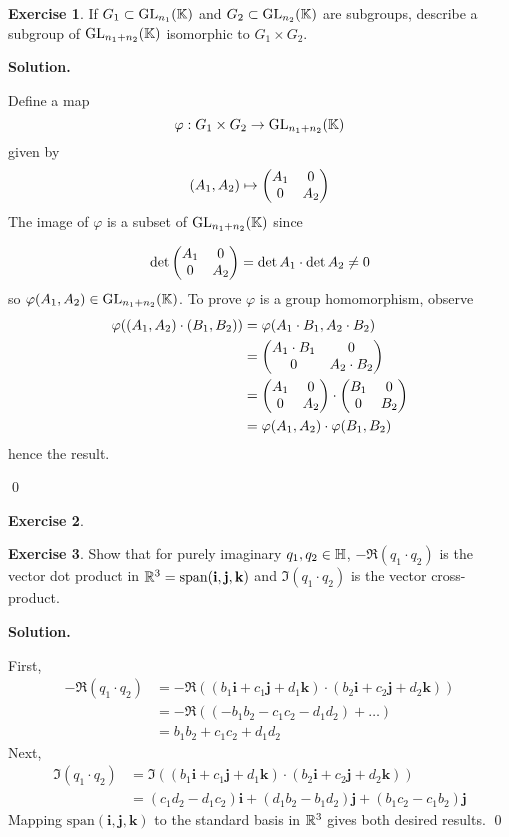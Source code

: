 \documentclass[12pt]{book}
\theoremstyle{definition}
\newtheorem{exercise}{Exercise}[chapter]
\newenvironment{solution}
{%
  \par\noindent\textbf{Solution.}\quad
}
{%
  \qed\par
}
\begin{document}
\begin{exercise}
  If $G_1 \subset \mathrm{GL}_{n_1}(\mathbb{K})$ and $G_2 \subset \mathrm{GL}_{n_2}(\mathbb{K})$ are subgroups, describe a subgroup of $\mathrm{GL}_{n_1 + n_2}(\mathbb{K})$ isomorphic to $G_1 \times G_2$.
\end{exercise}
\begin{solution}
  Define a map 
  \[
  \varphi : G_1 \times G_2 \to \mathrm{GL}_{n_1 + n_2}(\mathbb{K}) \\
  \]
  given by
  \[
  (A_1, A_2) \mapsto \begin{pmatrix} A_1 & 0 \\ 0 & A_2 \end{pmatrix}
  \]
  The image of $\varphi$ is a subset of $\mathrm{GL}_{n_1 + n_2}(\mathbb{K})$ since

  \[
  \det \begin{pmatrix} A_1 & 0 \\ 0 & A_2 \end{pmatrix} = \det A_1 \cdot \det A_2 \neq 0
  \]
  so $\varphi(A_1, A_2) \in \mathrm{GL}_{n_1 + n_2}(\mathbb{K})$.
  To prove $\varphi$ is a group homomorphism, observe
  \[
  \begin{aligned}
    \varphi((A_1, A_2) \cdot (B_1, B_2)) &= \varphi(A_1 \cdot B_1, A_2 \cdot B_2) \\
                                         &= \begin{pmatrix} A_1 \cdot B_1 & 0 \\ 0 & A_2 \cdot B_2 \end{pmatrix} \\
                                         &= \begin{pmatrix} A_1 & 0 \\ 0 & A_2 \end{pmatrix} \cdot \begin{pmatrix} B_1 & 0 \\ 0 & B_2 \end{pmatrix} \\
                                         &= \varphi(A_1, A_2) \cdot \varphi(B_1, B_2)
  \end{aligned}
  \]    
  hence the result.

\end{solution}

\begin{exercise}
  
\end{exercise}

\begin{exercise}
  Show that for purely imaginary $q_1, q_2 \in \mathbb{H}$, $-\Re (q_1 \cdot q_2)$ is the vector dot product in $\mathbb{R}^3 = \text{span}(\mathbf{i},
  \mathbf{j},\mathbf{k})$ and $\Im(q_1 \cdot q_2)$ is the vector cross-product.
\end{exercise}

\begin{solution}
  First,
  \[
  \begin{aligned}
    -\Re (q_1 \cdot q_2) &= -\Re ((b_1\mathbf{i} + c_1\mathbf{j} + d_1\mathbf{k}) \cdot (b_2\mathbf{i} + c_2\mathbf{j} + d_2\mathbf{k})) \\
                         &= -\Re((- b_1b_2 - c_1c_2 - d_1d_2) + \dots) \\
                         &= b_1b_2 + c_1c_2 + d_1d_2
  \end{aligned}
  \]
  Next, 
  \[
  \begin{aligned}
    \Im (q_1 \cdot q_2) &= \Im ((b_1\mathbf{i} + c_1\mathbf{j} + d_1\mathbf{k}) \cdot (b_2\mathbf{i} + c_2\mathbf{j} + d_2\mathbf{k})) \\
                        &= (c_1d_2 - d_1c_2)\mathbf{i} + (d_1b_2 - b_1d_2)\mathbf{j} + (b_1c_2 - c_1b_2)\mathbf{j}
  \end{aligned}
  \]
  Mapping $\text{span}(\mathbf{i},\mathbf{j},\mathbf{k})$ to the standard basis in $\mathbb{R}^3$ gives both desired results.
\end{solution}
\end{document}
